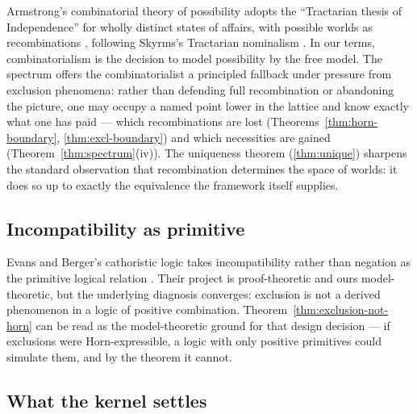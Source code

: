 \documentclass[10pt, letterpaper]{article}
\theoremstyle{remark}
\begin{document}
Armstrong's combinatorial theory of possibility adopts the ``Tractarian
thesis of Independence'' for wholly distinct states of affairs, with
possible worlds as recombinations \cite{armstrong1989}, following Skyrms's
Tractarian nominalism \cite{skyrms1981}. In our terms, combinatorialism is
the decision to model possibility by the free model. The spectrum offers the
combinatorialist a principled fallback under pressure from exclusion
phenomena: rather than defending full recombination or abandoning the
picture, one may occupy a named point lower in the lattice and know exactly
what one has paid --- which recombinations are lost
(Theorems~\ref{thm:horn-boundary}, \ref{thm:excl-boundary}) and which
necessities are gained (Theorem~\ref{thm:spectrum}(iv)). The uniqueness
theorem (\ref{thm:unique}) sharpens the standard observation that
recombination determines the space of worlds: it does so up to exactly the
equivalence the framework itself supplies.

\subsection{Incompatibility as primitive}

Evans and Berger's cathoristic logic takes incompatibility rather than
negation as the primitive logical relation \cite{evans2014}. Their project is
proof-theoretic and ours model-theoretic, but the underlying diagnosis
converges: exclusion is not a derived phenomenon in a logic of positive
combination. Theorem~\ref{thm:exclusion-not-horn} can be read as the
model-theoretic ground for that design decision --- if exclusions were
Horn-expressible, a logic with only positive primitives could simulate them,
and by the theorem it cannot.

\subsection{What the kernel settles}
\end{document}
